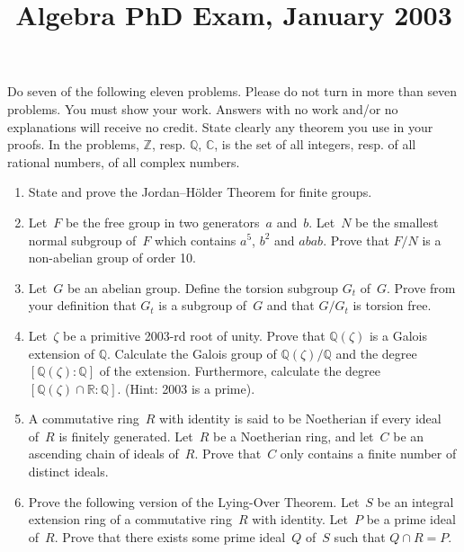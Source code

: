\documentclass[11pt,letterpaper]{article}
\title{Algebra PhD Exam, January 2003}
\author{}
\date{}
\newenvironment{examproblems}[2]{%
  \def\ProblemHeadingTag{#2}%
  \AssignTaggingSocketPlug{block/list/label}{examproblem}%
  \begin{enumerate}%
  \setcounter{enumi}{#1}%
  \renewcommand{\labelenumi}{\textbf{\theenumi.}}%
  \setlength{\topsep}{0.35em}%
  \setlength{\partopsep}{0pt}%
  \setlength{\itemsep}{0.48em}%
  \setlength{\parsep}{0.18em}%
}{\end{enumerate}}
\newenvironment{examinstructions}{%
  \par\begingroup\itshape
}{%
  \par\endgroup\vspace{0.18em}
}
\begin{document}
\maketitle
\thispagestyle{empty}
\begin{examinstructions}
Do seven of the following eleven problems. Please do not turn in more than seven problems. You must show your work. Answers with no work and/or no explanations will receive no credit. State clearly any theorem you use in your proofs. In the problems, \(\mathbb Z\), resp. \(\mathbb Q\), \(\mathbb C\), is the set of all integers, resp. of all rational numbers, of all complex numbers.
\end{examinstructions}
\begin{examproblems}{0}{H2}
\def\ProblemHeadingText{Problem 1.}
\item
State and prove the Jordan–Hölder Theorem for finite groups.
\def\ProblemHeadingText{Problem 2.}
\item
Let~\(F\) be the free group in two generators~\(a\) and~\(b\). Let~\(N\) be the smallest normal subgroup of~\(F\) which contains \(a^5\), \(b^2\) and \(abab\). Prove that \(F/N\) is a non-abelian group of order 10.
\def\ProblemHeadingText{Problem 3.}
\item
Let~\(G\) be an abelian group. Define the torsion subgroup \(G_t\) of~\(G\). Prove from your definition that \(G_t\) is a subgroup of~\(G\) and that \(G/G_t\) is torsion free.
\def\ProblemHeadingText{Problem 4.}
\item
Let~\(\zeta\) be a primitive 2003-rd root of unity. Prove that \(\mathbb Q(\zeta)\) is a Galois extension of \(\mathbb Q\). Calculate the Galois group of \(\mathbb Q(\zeta)/\mathbb Q\) and the degree \([\mathbb Q(\zeta):\mathbb Q]\) of the extension. Furthermore, calculate the degree \([\mathbb Q(\zeta)\cap\mathbb R:\mathbb Q]\). (Hint: 2003 is a prime).
\def\ProblemHeadingText{Problem 5.}
\item
A commutative ring~\(R\) with identity is said to be Noetherian if every ideal of~\(R\) is finitely generated. Let~\(R\) be a Noetherian ring, and let~\(C\) be an ascending chain of ideals of~\(R\). Prove that~\(C\) only contains a finite number of distinct ideals.
\def\ProblemHeadingText{Problem 6.}
\item
Prove the following version of the Lying-Over Theorem. Let~\(S\) be an integral extension ring of a commutative ring~\(R\) with identity. Let~\(P\) be a prime ideal of~\(R\). Prove that there exists some prime ideal~\(Q\) of~\(S\) such that \(Q\cap R=P\).
\def\ProblemHeadingText{Problem 7.}

\end{examproblems}
\end{document}
